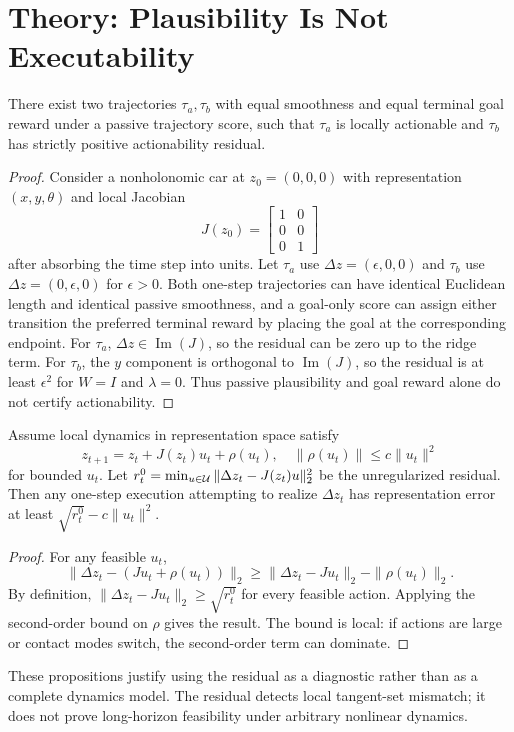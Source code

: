 \section{Theory: Plausibility Is Not Executability}

\begin{proposition}
There exist two trajectories $\tau_a,\tau_b$ with equal smoothness and equal terminal goal reward under a passive trajectory score, such that $\tau_a$ is locally actionable and $\tau_b$ has strictly positive actionability residual.
\end{proposition}
\begin{proof}
Consider a nonholonomic car at $z_0=(0,0,0)$ with representation $(x,y,\theta)$ and local Jacobian
\[
J(z_0)=\begin{bmatrix}1&0\\0&0\\0&1\end{bmatrix}
\]
after absorbing the time step into units. Let $\tau_a$ use $\Delta z=(\epsilon,0,0)$ and $\tau_b$ use $\Delta z=(0,\epsilon,0)$ for $\epsilon>0$. Both one-step trajectories can have identical Euclidean length and identical passive smoothness, and a goal-only score can assign either transition the preferred terminal reward by placing the goal at the corresponding endpoint. For $\tau_a$, $\Delta z\in\operatorname{Im}(J)$, so the residual can be zero up to the ridge term. For $\tau_b$, the $y$ component is orthogonal to $\operatorname{Im}(J)$, so the residual is at least $\epsilon^2$ for $W=I$ and $\lambda=0$. Thus passive plausibility and goal reward alone do not certify actionability.
\end{proof}

\begin{proposition}
Assume local dynamics in representation space satisfy
\[
z_{t+1}=z_t+J(z_t)u_t+\rho(u_t),\quad \|\rho(u_t)\|\le c\|u_t\|^2
\]
for bounded $u_t$. Let $r_t^0=\min_{u\in\mathcal{U}}\|\Delta z_t-J(z_t)u\|_2^2$ be the unregularized residual. Then any one-step execution attempting to realize $\Delta z_t$ has representation error at least $\sqrt{r_t^0}-c\|u_t\|^2$.
\end{proposition}
\begin{proof}
For any feasible $u_t$,
\[
\|\Delta z_t-(J u_t+\rho(u_t))\|_2
\ge \|\Delta z_t-Ju_t\|_2-\|\rho(u_t)\|_2.
\]
By definition, $\|\Delta z_t-Ju_t\|_2\ge\sqrt{r_t^0}$ for every feasible action. Applying the second-order bound on $\rho$ gives the result. The bound is local: if actions are large or contact modes switch, the second-order term can dominate.
\end{proof}

These propositions justify using the residual as a diagnostic rather than as a complete dynamics model. The residual detects local tangent-set mismatch; it does not prove long-horizon feasibility under arbitrary nonlinear dynamics.
